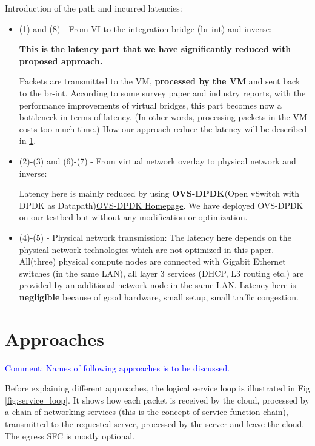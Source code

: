 \documentclass[12pt]{article}
\newcommand{\blue}[1]{\textcolor{blue}{Comment: #1}}
\begin{document}
Introduction of the path and incurred latencies:

\begin{itemize}
    \item (1) and (8) - From VI to the integration bridge (br-int) and inverse:

        \textbf{This is the latency part that we have significantly reduced with proposed approach.}

        Packets are transmitted to the VM, \textbf{processed by the VM} and sent back to the br-int.
        According to some survey paper and industry reports, with the performance improvements of virtual bridges, this
        part becomes now a bottleneck in terms of latency. (In other words, processing packets in the VM costs too much
        time.) How our approach reduce the latency will be described in \ref{sec:approaches}.

    \item (2)-(3) and (6)-(7) - From virtual network overlay to physical network and inverse:

        Latency here is mainly reduced by using \textbf{OVS-DPDK}(Open vSwitch with DPDK as
        Datapath)\href{http://docs.openvswitch.org/en/latest/intro/install/dpdk/}{OVS-DPDK Homepage}.
        We have deployed OVS-DPDK on our testbed but without any modification or optimization.

    \item (4)-(5) - Physical network transmission:
        The latency here depends on the physical network technologies which are not optimized in this paper.
        All(three) physical compute nodes are connected with Gigabit Ethernet switches (in the same LAN), all layer 3
        services (DHCP, L3 routing etc.) are provided by an additional network node in the same LAN.
        Latency here is \textbf{negligible} because of good hardware, small setup, small traffic congestion.
\end{itemize}

\section{Approaches}%
\label{sec:approaches}
\blue{Names of following approaches is to be discussed.}

Before explaining different approaches, the logical service loop is illustrated in Fig \ref{fig:service_loop}.  It shows
how each packet is received by the cloud, processed by a chain of networking services (this is the concept of service
function chain), transmitted to the requested server, processed by the server and leave the cloud. The egress SFC is
mostly optional.
\end{document}
